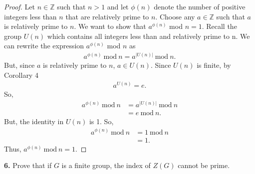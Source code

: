 \documentclass[12pt, letterpaper]{article}
\begin{document}
\begin{proof}
Let $n\in \mathbb{Z}$ such that $n > 1$ and let $\phi(n)$ denote the number of positive integers less than $n$ that are relatively prime to $n$. Choose any $a \in \mathbb{Z}$ such that $a$ is relatively prime to $n$. We want to show that $a^{\phi(n)}$ mod $n = 1$. Recall the group $U(n)$ which contains all integers less than and relatively prime to n. We can rewrite the expression $a^{\phi(n)}$ mod $n$ as 
\begin{align*}
    a^{\phi(n)} \ \text{mod} \ n = a^{|U(n)|} \ \text{mod} \ n.
\end{align*}
But, since $a$ is relatively prime to $n$, $a \in U(n)$. Since $U(n)$ is finite, by Corollary 4
\begin{align*}
    a^{U(n)} = e.
\end{align*}
So,
\begin{align*}
    a^{\phi(n)} \ \text{mod} \ n &= a^{|U(n)|} \ \text{mod} \ n \\
    &= e \ \text{mod} \ n.
\end{align*}
But, the identity in $U(n)$ is 1. So,
\begin{align*}
     a^{\phi(n)} \ \text{mod} \ n &= 1 \ \text{mod} \ n \\
     &= 1.
\end{align*}
Thus, $a^{\phi(n)} \ \text{mod} \ n = 1$.
\end{proof}
\vspace{0.2em}
\textbf{6.} Prove that if $G$ is a finite group, the index of $Z(G)$ cannot be prime.
\end{document}
